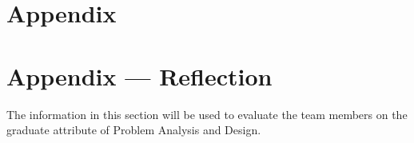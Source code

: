 \documentclass[12pt, titlepage]{article}
\begin{document}
\section{Appendix} \label{Appendix}


\newpage{}

\section*{Appendix --- Reflection}


The information in this section will be used to evaluate the team members on the
graduate attribute of Problem Analysis and Design.


\end{document}
